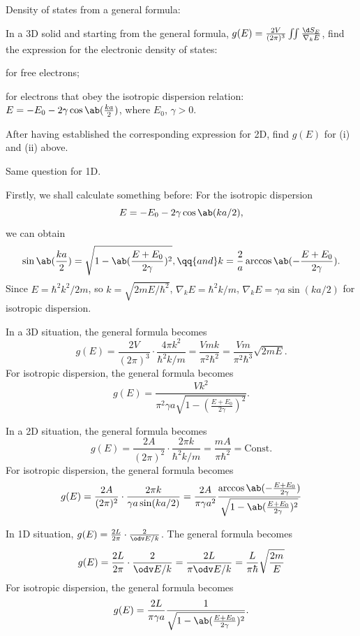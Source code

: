 \begin{problem}
  Density of states from a general formula:
  \begin{enumext}[label = (\alph*)]
    \item In a 3D solid and starting from the general formula,
    $g(E) = \frac{2V}{(2\pi)^3} \iint \frac{\d S_E}{\nabla_kE}$,
    find the expression for the electronic density of states:
    \begin{enumerate*}[label = (\roman*)]
      \item for free electrons;
      \item for electrons that obey the isotropic dispersion relation:
      $E = -E_0 - 2\gamma \cos\ab(\frac{ka}{2})$, where $E_0$, $\gamma > 0$.
    \end{enumerate*}
    \item After having established the corresponding expression for 2D,
    find $g(E)$ for (i) and (ii) above.
    \item Same question for 1D.
  \end{enumext}
\end{problem}
\begin{solution}
  Firstly, we shall calculate something before: For the isotropic dispersion
  \[
    E = -E_0 - 2\gamma \cos\ab(ka/2),
  \]
  we can obtain
  \[
    \sin\ab(\frac{ka}2) = \sqrt{1 - \ab(\frac{E+E_0}{2\gamma})^2}, \qq{and}
    k = \frac2a \arccos\ab(-\frac{E + E_0}{2\gamma}).
  \]
  Since $E = \hbar^2k^2/2m$, so $k = \sqrt{2mE/\hbar^2}$,
  $\nabla_k E = \hbar^2k/m$,
  $\nabla_k E = \gamma a \sin(ka/2)$ for isotropic dispersion.
  \begin{enumext}[label = (\alph*)]
    \item In a 3D situation, the general formula becomes
    \[
      g(E) = \frac{2V}{(2\pi)^3} \cdot \frac{4\pi k^2}{\hbar^2k/m}
    = \frac{Vmk}{\pi^2\hbar^2} = \frac{Vm}{\pi^2\hbar^3} \sqrt{2mE}.
    \]
    For isotropic dispersion, the general formula becomes
    \[
      g(E) = \frac{Vk^2}{\pi^2\gamma a\sqrt{1 - (\frac{E+E_0}{2\gamma})^2}}.
    \]
    \item In a 2D situation, the general formula becomes
    \[
      g(E) = \frac{2A}{(2\pi)^2} \cdot \frac{2\pi k}{\hbar^2k/m}
    = \frac{mA}{\pi\hbar^2} = \text{Const}.
    \]
    For isotropic dispersion, the general formula becomes
    \[
      g(E) = \frac{2A}{(2\pi)^2} \cdot \frac{2\pi k}{\gamma a \sin(ka/2)}
    = \frac{2A}{\pi\gamma a^2} \frac{\arccos\ab(-\frac{E+E_0}{2\gamma})}
        {\sqrt{1 - \ab(\frac{E+E_0}{2\gamma})^2}}
    \]
    \item In 1D situation, $g(E) = \frac{2L}{2\pi} \cdot \frac{2}{\odv E/k}$.
    The general formula becomes
    \[
      g(E) = \frac{2L}{2\pi} \cdot \frac{2}{\odv E/k} = \frac{2L}{\pi\odv E/k}
    = \frac L{\pi\hbar} \sqrt{\frac{2m}{E}}
    \]
    For isotropic dispersion, the general formula becomes
    \[
      g(E) = \frac{2L}{\pi\gamma a} \frac{1}{\sqrt{1 - \ab(\frac{E+E_0}{2\gamma})^2}}.
    \]
  \end{enumext}
\end{solution}